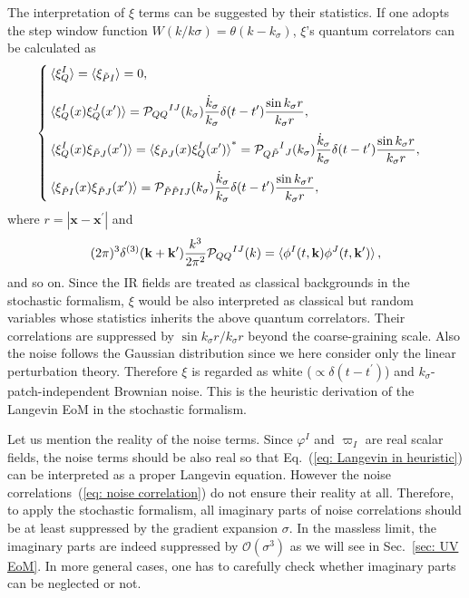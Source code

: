 \documentclass[a4paper,11pt]{article}
\newcommand{\dps}{\displaystyle}
\newcommand{\calO}{\mathcal{O}}
\newcommand{\calP}{\mathcal{P}}
\newcommand{\bae}[1]{\begin{align} #1 \end{align}}
\newcommand{\bce}[1]{\begin{cases} #1 \end{cases}}
\begin{document}
The interpretation of $\xi$ terms can be suggested by their statistics. If one adopts the step window function $W(k/k\sigma)=\theta(k-k_\sigma)$,
$\xi$'s quantum correlators can be calculated as
\bae{\label{eq: noise correlation}
	\bce{
		\dps
		\braket{\xi_Q^I}=\braket{\xi_{\tilde{P}I}}=0, \\[10pt]
		\dps
		\braket{\xi_Q^I(x)\xi_Q^J(x^\prime)}
		=\calP_{QQ}{}^{IJ}(k_\sigma)\frac{\dot{k}_\sigma}{k_\sigma}\delta(t-t^\prime)\frac{\sin k_\sigma r}{k_\sigma r},
		\\[10pt]
		\dps
		\braket{\xi_Q^I(x)\xi_{\tilde{P}J}(x^\prime)}=\braket{\xi_{\tilde{P}J}(x)\xi_Q^I(x^\prime)}^*
		=\calP_{Q\tilde{P}}{}^I{}_J(k_\sigma)\frac{\dot{k}_\sigma}{k_\sigma}\delta(t-t^\prime)
		\frac{\sin k_\sigma r}{k_\sigma r}, \\[10pt]
		\dps
		\braket{\xi_{\tilde{P}I}(x)\xi_{\tilde{P}J}(x^\prime)}=\calP_{\tilde{P}\tilde{P}IJ}(k_\sigma)\frac{\dot{k}_\sigma}{k_\sigma}\delta(t-t^\prime)
		\frac{\sin k_\sigma r}{k_\sigma r},
	}
}
where $r=|\mathbf{x}-\mathbf{x}^\prime|$ and
\bae{
	(2\pi)^3\delta^{(3)}(\mathbf{k}+\mathbf{k}^\prime)\frac{k^3}{2\pi^2}\calP_{QQ}{}^{IJ}(k)=\braket{\phi^I(t,\mathbf{k})\phi^J(t,\mathbf{k}^\prime)},
}
and so on. Since the IR fields are treated as classical backgrounds in the stochastic formalism, $\xi$ would be also interpreted as 
classical but random variables whose statistics inherits the above quantum correlators. Their correlations are suppressed by
$\sin k_\sigma r/k_\sigma r$ beyond the coarse-graining scale. Also the noise follows the Gaussian distribution since we here consider
only the linear perturbation theory.
Therefore $\xi$ is regarded as white ($\propto\delta(t-t^\prime)$) and $k_\sigma$-patch-independent
Brownian noise. This is the heuristic derivation of the Langevin EoM in the stochastic formalism.

Let us mention the reality of the noise terms.
Since $\varphi^I$ and $\varpi_I$ are real scalar fields, the noise terms should be also real so that Eq.~(\ref{eq: Langevin in heuristic})
can be interpreted as a proper Langevin equation. However the noise correlations~(\ref{eq: noise correlation}) do not ensure their reality at all.
Therefore, to apply the stochastic formalism, all imaginary parts of noise correlations should be at least suppressed by 
the gradient expansion $\sigma$. In the massless limit, the imaginary parts are indeed suppressed by $\calO(\sigma^3)$ as we will see
in Sec.~\ref{sec: UV EoM}. In more general cases, one has to carefully check whether imaginary parts can be neglected or not.%
\end{document}
